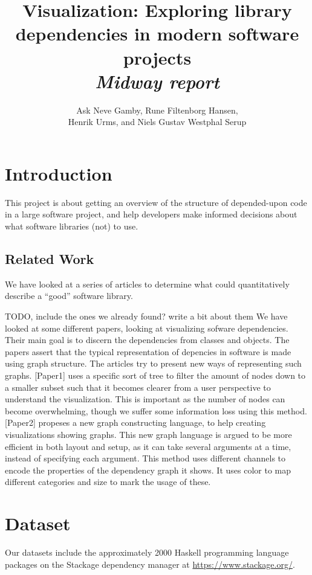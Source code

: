 \documentclass[a4paper,12pt]{article}
\title{\textbf{Visualization}: Exploring library dependencies in modern software projects\\\emph{Midway report}}
\author{Ask Neve Gamby, Rune Filtenborg Hansen,\\
Henrik Urms, and Niels Gustav Westphal Serup}
\begin{document}
\maketitle

\section{Introduction}

This project is about getting an overview of the structure of depended-upon code
in a large software project, and help developers make informed decisions about
what software libraries (not) to use.


\subsection{Related Work}

We have looked at a series of articles to determine what could quantitatively
describe a ``good'' software library.

TODO, include the ones we already found? write a bit about them
We have looked at some different papers, looking at visualizing sofware dependencies.
Their main goal is to discern the dependencies from classes and objects. The papers assert
that the typical representation of depencies in software is made using graph structure.
The articles try to present new ways of representing such graphs. [Paper1] uses a specific
sort of tree to filter the amount of nodes down to a smaller subset such that it becomes
clearer from a user perspective to understand the visualization. This is important as the
number of nodes can become overwhelming, though we suffer some information loss using this
method. [Paper2] propeses a new graph constructing language, to help creating visualizations
showing graphs. This new graph language is argued to be more efficient in both layout and
setup, as it can take several arguments at a time, instead of specifying each argument.
This method uses different channels to encode the properties of the dependency graph it
shows. It uses color to map different categories and size to mark the usage of these.

\section{Dataset}

Our datasets include the approximately 2000 Haskell programming language
packages on the Stackage dependency manager at \url{https://www.stackage.org/}.
\end{document}
